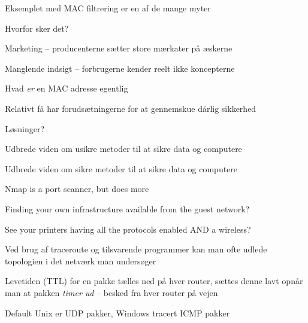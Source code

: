 \documentclass[Screen16to9,17pt]{foils}
\begin{document}

\begin{list1}
\item Eksemplet med MAC filtrering er en af de mange myter
\item Hvorfor sker det?
\item Marketing -- producenterne sætter store mærkater på æskerne
\item Manglende indsigt -- forbrugerne kender reelt ikke koncepterne
\item Hvad \emph{er} en MAC adresse egentlig
\item Relativt få har forudsætningerne for at gennemskue dårlig sikkerhed
\item Løsninger?

\item Udbrede viden om usikre metoder til at sikre data og computere
\item Udbrede viden om sikre metoder til at sikre data og computere
\end{list1}








\begin{list2}
\item Nmap is a port scanner, but does more
\item Finding your own infrastructure available from the guest network?
\item See your printers having all the protocols enabled AND a wireless?
\end{list2}



\begin{list1}
\item Ved brug af traceroute og tilsvarende programmer kan man ofte
  udlede topologien i det netværk man undersøger
\item Levetiden (TTL) for en pakke tælles ned på hver router, sættes denne lavt
  opnår man at pakken \emph{timer ud} -- besked fra hver router på vejen
\item Default Unix er UDP pakker, Windows tracert ICMP pakker
\end{list1}
\end{document}

